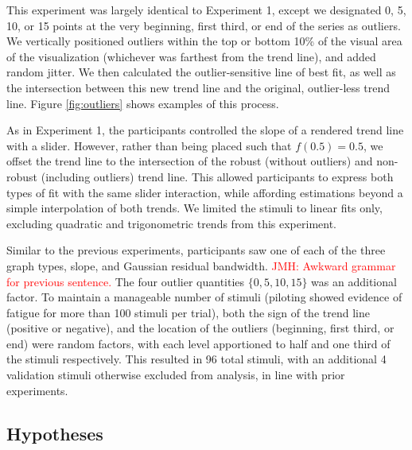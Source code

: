 \documentclass{sigchi}
\newcommand{\jeff}[1]{\textcolor{red}{JMH: #1}}
\begin{document}
This experiment was largely identical to Experiment 1, except we designated 0, 5, 10, or 15 points at the very beginning, first third, or end of the series as outliers. We vertically positioned outliers within the top or bottom 10\% of the visual area of the visualization (whichever was farthest from the trend line), and added random jitter. We then calculated the outlier-sensitive line of best fit, as well as the intersection between this new trend line and the original, outlier-less trend line. Figure \ref{fig:outliers} shows examples of this process.

As in Experiment 1, the participants controlled the slope of a rendered trend line with a slider. However, rather than being placed such that $f(0.5)=0.5$, we offset the trend line to the intersection of the robust (without outliers) and non-robust (including outliers) trend line. This allowed participants to express both types of fit with the same slider interaction, while affording estimations beyond a simple interpolation of both trends. We limited the stimuli to linear fits only, excluding quadratic and trigonometric trends from this experiment.

Similar to the previous experiments, participants saw one of each of the three graph types, slope, and Gaussian residual bandwidth. \jeff{Awkward grammar for previous sentence.} The four outlier quantities $\{0,5,10,15\}$ was an additional factor. To maintain a manageable number of stimuli (piloting showed evidence of fatigue for more than 100 stimuli per trial), both the sign of the trend line (positive or negative), and the location of the outliers (beginning, first third, or end) were random factors, with each level apportioned to half and one third of the stimuli respectively. This resulted in 96 total stimuli, with an additional 4 validation stimuli otherwise excluded from analysis, in line with prior experiments.

\subsection{Hypotheses}
\end{document}
